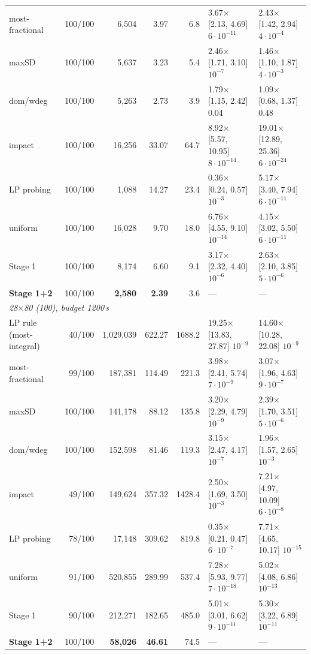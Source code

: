 \begin{table}[t]
\begin{tabular}{lrrrrll}
most-fractional & 100/100 & 6,504 & 3.97 & 6.8 & 3.67$\times$ [2.13, 4.69] $6\cdot10^{-11}$ & 2.43$\times$ [1.42, 2.94] $4\cdot10^{-4}$ \\
maxSD & 100/100 & 5,637 & 3.23 & 5.4 & 2.46$\times$ [1.71, 3.10] $10^{-7}$ & 1.46$\times$ [1.10, 1.87] $4\cdot10^{-3}$ \\
dom/wdeg & 100/100 & 5,263 & 2.73 & 3.9 & 1.79$\times$ [1.15, 2.42] $0.04$ & 1.09$\times$ [0.68, 1.37] $0.48$ \\
impact & 100/100 & 16,256 & 33.07 & 64.7 & 8.92$\times$ [5.57, 10.95] $8\cdot10^{-14}$ & 19.01$\times$ [12.89, 25.36] $6\cdot10^{-24}$ \\
LP probing & 100/100 & 1,088 & 14.27 & 23.4 & 0.36$\times$ [0.24, 0.57] $10^{-3}$ & 5.17$\times$ [3.40, 7.94] $6\cdot10^{-11}$ \\
uniform & 100/100 & 16,028 & 9.70 & 18.0 & 6.76$\times$ [4.55, 9.10] $10^{-14}$ & 4.15$\times$ [3.02, 5.50] $6\cdot10^{-11}$ \\
Stage 1 & 100/100 & 8,174 & 6.60 & 9.1 & 3.17$\times$ [2.32, 4.40] $10^{-6}$ & 2.63$\times$ [2.10, 3.85] $5\cdot10^{-6}$ \\
\textbf{Stage 1+2} & 100/100 & \textbf{2,580} & \textbf{2.39} & 3.6 & --- & --- \\
\midrule
\multicolumn{7}{l}{\emph{28$\times$80 (100), budget 1200\,s}} \\
LP rule (most-integral) & 40/100 & 1,029,039 & 622.27 & 1688.2 & 19.25$\times$ [13.83, 27.87] $10^{-9}$ & 14.60$\times$ [10.28, 22.08] $10^{-9}$ \\
most-fractional & 99/100 & 187,381 & 114.49 & 221.3 & 3.98$\times$ [2.41, 5.74] $7\cdot10^{-9}$ & 3.07$\times$ [1.96, 4.63] $9\cdot10^{-7}$ \\
maxSD & 100/100 & 141,178 & 88.12 & 135.8 & 3.20$\times$ [2.29, 4.79] $10^{-9}$ & 2.39$\times$ [1.70, 3.51] $5\cdot10^{-6}$ \\
dom/wdeg & 100/100 & 152,598 & 81.46 & 119.3 & 3.15$\times$ [2.47, 4.17] $10^{-7}$ & 1.96$\times$ [1.57, 2.65] $10^{-3}$ \\
impact & 49/100 & 149,624 & 357.32 & 1428.4 & 2.50$\times$ [1.69, 3.50] $10^{-3}$ & 7.21$\times$ [4.97, 10.09] $6\cdot10^{-8}$ \\
LP probing & 78/100 & 17,148 & 309.62 & 819.8 & 0.35$\times$ [0.21, 0.47] $6\cdot10^{-7}$ & 7.71$\times$ [4.65, 10.17] $10^{-15}$ \\
uniform & 91/100 & 520,855 & 289.99 & 537.4 & 7.28$\times$ [5.93, 9.77] $7\cdot10^{-18}$ & 5.02$\times$ [4.08, 6.86] $10^{-13}$ \\
Stage 1 & 90/100 & 212,271 & 182.65 & 485.0 & 5.01$\times$ [3.01, 6.62] $9\cdot10^{-11}$ & 5.30$\times$ [3.22, 6.89] $10^{-11}$ \\
\textbf{Stage 1+2} & 100/100 & \textbf{58,026} & \textbf{46.61} & 74.5 & --- & --- \\
\bottomrule
\end{tabular}
\end{table}